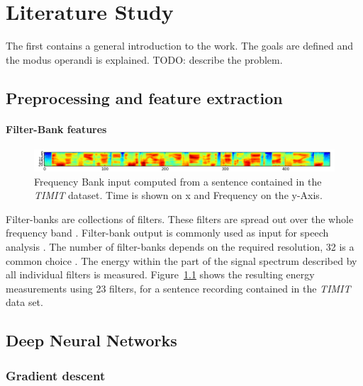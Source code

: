 \chapter{Literature Study}
\label{cha:intro}
The first contains a general introduction to the work. The goals are
defined and the modus operandi is explained.
TODO: describe the problem.


\section{Preprocessing and feature extraction}

\subsubsection{Filter-Bank features}
\begin{figure}
\centering
\includegraphics[width=1.0\linewidth]{../png/timitInput}
\caption{Frequency Bank input computed from a sentence contained in the \textit{TIMIT} dataset. Time is shown on x and Frequency on the y-Axis.}
\label{fig:timitInput}
\end{figure}
Filter-banks are collections of filters. These filters are spread out over the whole frequency band \cite{Huang2001}. Filter-bank output is commonly used as input for speech analysis \cite{Huang2001}\cite{Chan2015}. The number of filter-banks depends on the required resolution, 32 is a common choice \cite{Juang1987}. The energy within the part of the signal spectrum described by all individual filters is measured. Figure~\ref{fig:timitInput} shows the resulting energy measurements using 23 filters, for a sentence recording contained in the \textit{TIMIT} data set. 
 



\section{Deep Neural Networks}

\subsection{Gradient descent}

